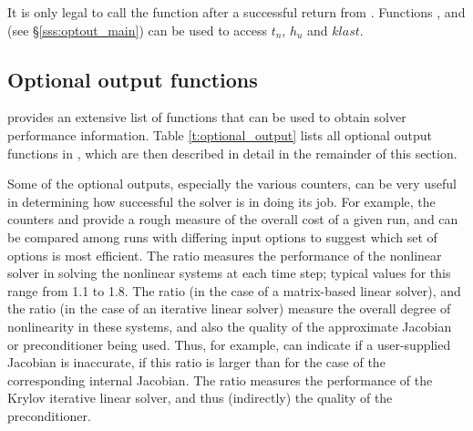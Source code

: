 {{}
{
  It is only legal to call the function  after a
  successful return from . Functions ,
   and  (see \S\ref{sss:optout_main})
  can be used to access $t_n$, $h_u$ and $klast$.
}

\subsection{Optional output functions}\label{ss:optional_output}

{\idas} provides an extensive list of functions that can be used to obtain
solver performance information.  Table \ref{t:optional_output} lists all optional
output functions in {\idas}, which are then described in detail in the remainder
of this section.

Some of the optional outputs, especially the various counters, can be
very useful in determining how successful the {\idas} solver is in
doing its job.  For example, the counters  and 
provide a rough measure of the overall cost of a given run, and can be
compared among runs with differing input options to suggest which set
of options is most efficient.  The ratio  measures
the performance of the nonlinear solver in solving the nonlinear
systems at each time step; typical values for this range from 1.1 to
1.8.  The ratio  (in the case of a matrix-based linear
solver), and the ratio  (in the case of an
iterative linear solver) measure the overall degree of nonlinearity
in these systems, and also the quality of the approximate Jacobian or
preconditioner being used.  Thus, for example, 
can indicate if a user-supplied Jacobian is inaccurate, if this ratio
is larger than for the case of the corresponding internal Jacobian.
The ratio  measures the performance of the Krylov
iterative linear solver, and thus (indirectly) the quality of the
preconditioner.

\vspace*{.2in}

\newlength{\colAA}
\settowidth{\colAA}{No. of residual calls for finite diff. Jacobian[-vector] evals.}
\newlength{\colBB}

}
